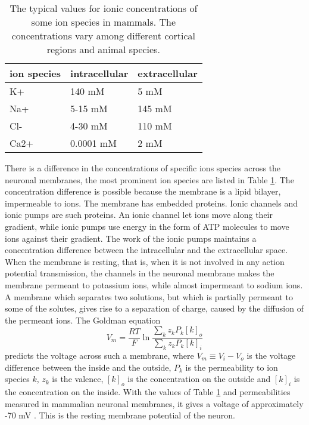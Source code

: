 \documentclass{article}
\begin{document}
\begin{table}[h!]
  \centering
  \caption{The typical values for ionic concentrations of some ion species in mammals\cite{Neuroscience}. The concentrations vary among different cortical regions and animal species.}
  \label{tab:ionic_concentrations}
  \begin{tabular}{l||l|l}
ion species & intracellular & extracellular \\
\hline
K+ & 140 mM & 5  mM\\
Na+ & 5-15 mM & 145 mM\\
Cl- & 4-30 mM& 110 mM\\
Ca2+ & 0.0001 mM & 2 mM  \\
 \end{tabular}
\end{table}
There is a difference in the concentrations of specific ions species across the neuronal membranes, the most prominent ion species are listed in Table \ref{tab:ionic_concentrations}.
The concentration difference is possible because the membrane is a lipid bilayer, impermeable to ions. The membrane has embedded proteins. Ionic channels and ionic pumps are such proteins. An ionic channel let ions move along their gradient, while ionic pumps use energy in the form of ATP molecules to move ions against their gradient. The work of the ionic pumps maintains a concentration difference between the intracellular and the extracellular space. When the membrane is resting, that is, when it is not involved in any action potential transmission, the channels in the neuronal membrane makes the membrane permeant to potassium ions, while almost impermeant to sodium ions. A membrane which separates two solutions, but which is partially permeant to some of the solutes, gives rise to a separation of charge, caused by the diffusion of the permeant ions.  The Goldman equation 
\begin{equation}\label{eq:goldman}
V_m = \frac{RT}{F}\ln \frac{\sum_k z_kP_k[k]_o}{\sum_k z_kP_k[k]_i}
\end{equation}
predicts the voltage across such a membrane, where $V_m \equiv V_i-V_o$ is the voltage difference between the inside and the outside, $P_k$ is the permeability to ion species $k$, $z_k$ is the valence, $[k]_o$ is the concentration on the outside and $[k]_i$ is the concentration on the inside. With the values of Table \ref{tab:ionic_concentrations} and permeabilities measured in mammalian neuronal membranes, it gives a voltage of approximately -70 mV \cite{Neuroscience}. This is the resting membrane potential of the neuron. 
\end{document}

